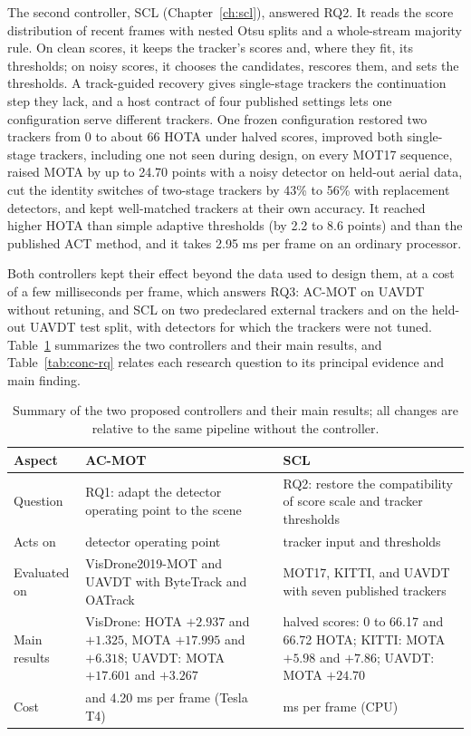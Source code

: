 The second controller, SCL (Chapter~\ref{ch:scl}), answered RQ2. It reads the score distribution of recent frames with nested Otsu splits and a whole-stream majority rule. On clean scores, it keeps the tracker's scores and, where they fit, its thresholds; on noisy scores, it chooses the candidates, rescores them, and sets the thresholds. A track-guided recovery gives single-stage trackers the continuation step they lack, and a host contract of four published settings lets one configuration serve different trackers. One frozen configuration restored two trackers from 0 to about 66 HOTA under halved scores, improved both single-stage trackers, including one not seen during design, on every MOT17 sequence, raised MOTA by up to 24.70 points with a noisy detector on held-out aerial data, cut the identity switches of two-stage trackers by 43\% to 56\% with replacement detectors, and kept well-matched trackers at their own accuracy. It reached higher HOTA than simple adaptive thresholds (by 2.2 to 8.6 points) and than the published ACT method, and it takes 2.95 ms per frame on an ordinary processor.

Both controllers kept their effect beyond the data used to design them, at a cost of a few milliseconds per frame, which answers RQ3: AC-MOT on UAVDT without retuning, and SCL on two predeclared external trackers and on the held-out UAVDT test split, with detectors for which the trackers were not tuned. Table~\ref{tab:conc-summary} summarizes the two controllers and their main results, and Table~\ref{tab:conc-rq} relates each research question to its principal evidence and main finding.

\begin{table}[tbp]
\centering
\caption{Summary of the two proposed controllers and their main results; all changes are relative to the same pipeline without the controller.}
\label{tab:conc-summary}
\begin{tabular}{>{\raggedright\arraybackslash}p{2.7cm}>{\raggedright\arraybackslash}p{5.6cm}>{\raggedright\arraybackslash}p{5.6cm}}
\toprule
Aspect & AC-MOT & SCL\\
\midrule
Question & RQ1: adapt the detector operating point to the scene & RQ2: restore the compatibility of score scale and tracker thresholds\\
Acts on & detector operating point & tracker input and thresholds\\
Evaluated on & VisDrone2019-MOT and UAVDT with ByteTrack and OATrack & MOT17, KITTI, and UAVDT with seven published trackers\\
Main results & VisDrone: HOTA $+2.937$ and $+1.325$, MOTA $+17.995$ and $+6.318$; UAVDT: MOTA $+17.601$ and $+3.267$ & halved scores: 0 to 66.17 and 66.72 HOTA; KITTI: MOTA $+5.98$ and $+7.86$; UAVDT: MOTA $+24.70$\\
Cost & 4.26 and 4.20 ms per frame (Tesla T4) & 2.95 ms per frame (CPU)\\
\bottomrule
\end{tabular}
\end{table}

